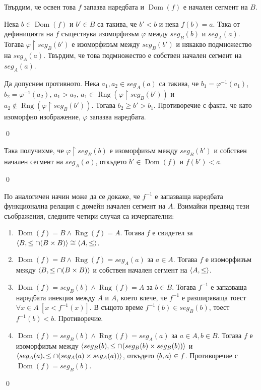 \quad
Твърдим, че освен това $f$ запазва наредбата и $\operatorname{Dom}(f)$ е начален сегмент на $B$.

\begin{tcolorbox}[mybox={Доказателство:}]
\quad
Нека $b \in \operatorname{Dom}(f)$ и $b' \in B$ са такива, че $b' < b$
и нека $f(b) = a$.
Така от дефиницията на $f$ съществува изоморфизъм $\varphi$ между $seg_B(b)$ и  $seg_A(a)$.
Тогава $\varphi \restriction seg_B(b')$ е изоморфизъм между $seg_B(b')$ и някакво подмножество на $seg_A(a)$.
Твърдим, че това подмножество е собствен начален сегмент на $seg_A(a)$.
\begin{tcolorbox}[mybox={Доказателство:}, colback=green!20, colframe=green!60]
\quad
Да допуснем противното.
Нека $a_1, a_2 \in seg_A(a)$ са такива, че
$b_1 = \varphi^{-1}(a_1)$,
$b_2 = \varphi^{-1}(a_2)$,
$a_1 > a_2$, $a_1 \in \operatorname{Rng}(\varphi \restriction seg_B(b'))$ и
$a_2 \notin \operatorname{Rng}(\varphi \restriction seg_B(b'))$.
Тогава $b_2 \ge b' > b_1$.
Противоречие с факта, че като изоморфно изображение, $\varphi$ запазва наредбата.

\qed
\end{tcolorbox}

\quad
Така получихме, че $\varphi \restriction seg_B(b)$ е изоморфизъм между $seg_B(b')$ и собствен начален сегмент на $seg_A(a)$,
откъдето $b' \in \operatorname{Dom}(f)$ и $f(b') < a$.

\qed
\end{tcolorbox}

\quad
По аналогичен начин може да се докаже, че $f^{-1}$ е запазваща наредбата функционална релация с
домейн начален сегмент на $A$.
Взимайки предвид тези съображения, следните четири случая са изчерпателни:

\begin{enumerate}[label={\arabic* сл.}]
\item
$\operatorname{Dom}(f) = B \land \operatorname{Rng}(f) = A$.
Тогава $f$ е свидетел за
$\langle B, \leq \cap (B \times B) \rangle \cong \langle A, \leq \rangle$.

\item
$\operatorname{Dom}(f) = B \land \operatorname{Rng}(f) = seg_A(a)$ за $a \in A$.
Тогава $f$ е изоморфизъм между $\langle B, \leq \cap (B \times B) \rangle$ и собствен начален сегмент на $\langle A, \leq \rangle$.

\item
$\operatorname{Dom}(f) = seg_B(b) \land \operatorname{Rng}(f) = A$ за $b \in B$.
Тогава $f^{-1}$ е запазваща наредбата инекция между $A$ и $A$, което влече, че $f^{-1}$ е разширяваща
тоест $\forall x \in A\ [x < f^{-1}(x)]$. В същото време $f^{-1}(b) \in seg_B(b)$, тоест $f^{-1}(b) < b$. Противоречие.

\item
$\operatorname{Dom}(f) = seg_B(b) \land \operatorname{Rng}(f) = seg_A(a)$ за $a \in A, b \in B$.
Тогава $f$ е изоморфизъм между
$\langle seg_B(b), \leq \cap (seg_B(b) \times seg_B(b)) \rangle$ и
$\langle seg_A(a), \leq \cap (seg_A(a) \times seg_A(a)) \rangle$,
откъдето $\langle b, a \rangle \in f$. Противоречие с $\operatorname{Dom}(f) = seg_B(b)$.
\end{enumerate}

\qed
